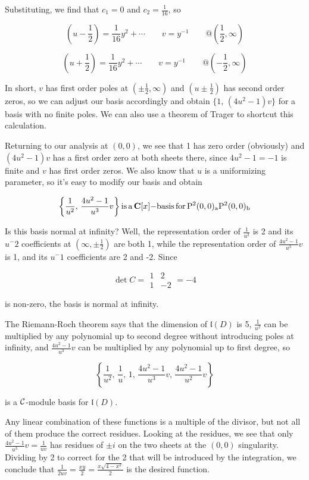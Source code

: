 Substituting, we find that $c_1 = 0$ and $c_2 = \frac{1}{16}$, so

$$(u-\frac12) = \frac{1}{16} y^2 + \cdots \qquad v=y^{-1} \qquad @(\frac12, \infty)$$

$$(u+\frac12) = \frac{1}{16} y^2 + \cdots \qquad v=y^{-1} \qquad @(-\frac12, \infty)$$

In short, $v$ has first order poles at $(\pm\frac12,\infty)$ and
$(u\pm\frac12)$ has second order zeros, so we can adjust our basis
accordingly and obtain $\{1,\,(4u^2-1)v\}$ for a basis with no finite
poles.  We can also use a theorem of Trager to shortcut this calculation.

Returning to our analysis at $(0,0)$, we see that 1 has zero order
(obviously) and $(4u^2-1)v$ has a first order zero at both sheets
there, since $4u^2-1=-1$ is finite and $v$ has first order zeros.
We also know that $u$ is a uniformizing parameter, so it's easy
to modify our basis and obtain

$$\left\{\frac{1}{u^2},\,\frac{4u^2-1}{u^3}v\right\} {\rm is\, a\,} {\bf C}[x]{\rm -basis\, for\, P^2(0,0)_aP^2(0,0)_b}$$

Is this basis normal at infinity?  Well, the representation order of
$\frac{1}{u^2}$ is 2 and its $u^-2$ coefficients at $(\infty, \pm
\frac12)$ are both 1, while the representation order of $\frac{4u^2-1}{u^3}v$
is 1, and its $u^-1$ coefficients are 2 and -2.  Since

$$\det C = \begin{array}{|cc|} 1 & 2 \\ 1 & -2 \end{array} = -4$$

is non-zero, the basis is normal at infinity.

The Riemann-Roch theorem says that the dimension of ${\mathfrak l}(D)$ is 5,
$\frac{1}{u^2}$ can be multiplied by any polynomial up to second
degree without introducing poles at infinity, and $\frac{4u^2-1}{u^3}v$
can be multiplied by any polynomial up to first degree, so

$$\left\{\frac{1}{u^2},\, \frac{1}{u},\, 1,\, \frac{4u^2-1}{u^3}v,\, \frac{4u^2-1}{u^2}v\right\}$$

is a ${\cal C}$-module basis for ${\mathfrak l}(D)$.

Any linear combination of these functions is a multiple of the
divisor, but not all of them produce the correct residues.  Looking at
the residues, we see that only $\frac{4u^2-1}{u^3}v = \frac{1}{uv}$
has residues of $\pm i$ on the two sheets at the $(0,0)$ singularity.
Dividing by 2 to correct for the 2 that will be introduced by the
integration, we conclude that $\frac{1}{2uv} = \frac{xy}{2} =
\frac{x\sqrt{4-x^2}}{2}$ is the desired function.

